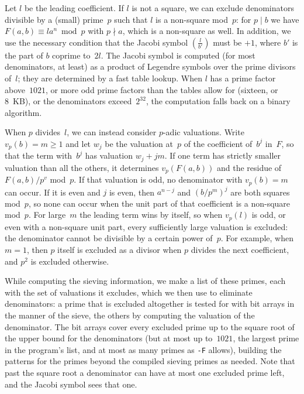 \documentclass[12pt,a4paper,oneside]{amsart}
\begin{document}
Let $l$ be the leading coefficient. If $l$ is not a square, we can exclude
denominators divisible by a (small) prime~$p$ such that $l$ is a non-square
mod~$p$: for $p \mid b$ we have $F(a,b) \equiv l a^n \bmod p$ with $p \nmid
a$, which is a non-square as well. In addition, we use the necessary
condition that the Jacobi symbol $\left(\frac{l}{b'}\right)$ must be $+1$,
where $b'$ is the part of $b$ coprime to~$2l$. The Jacobi symbol
is computed (for most denominators, at least) as a product
of Legendre symbols over the prime divisors of~$l$; they are determined
by a fast table lookup. When $l$ has a prime factor above~$1021$, or more odd
prime factors than the tables allow for (sixteen, or 8~KB), or the
denominators exceed~$2^{32}$, the computation falls back on a binary algorithm.

When $p$ divides~$l$, we can instead consider $p$-adic valuations.
Write $v_p(b) = m \ge 1$ and let $w_j$ be
the valuation at~$p$ of the coefficient of~$b^j$ in~$F$, so that the term
with~$b^j$ has valuation $w_j + jm$. If one term has strictly smaller
valuation than all the others, it determines $v_p(F(a,b))$ and the residue
of $F(a,b)/p^{v}$ mod~$p$. If that valuation is odd, no denominator with
$v_p(b) = m$ can occur. If it is even and $j$ is even, then $a^{n-j}$ and
$(b/p^m)^j$ are both squares mod~$p$, so none can occur when the unit part
of that coefficient is a non-square mod~$p$.
For large~$m$ the leading term wins by itself, so when $v_p(l)$ is
odd, or even with a non-square unit part, every sufficiently large valuation
is excluded: the denominator cannot be divisible by a certain power of~$p$.
For example, when $m = 1$, then $p$ itself is excluded as a divisor
when $p$ divides the next coefficient, and $p^2$ is excluded otherwise.

While computing the sieving information, we make a list of these primes,
each with the set of valuations it excludes, which we then use to eliminate
denominators: a prime that is excluded altogether is tested for with bit
arrays in the manner of the sieve, the others by computing the valuation of
the denominator. The bit arrays cover every excluded prime up to the square
root of the upper bound for the denominators (but at most up to~$1021$, the
largest prime in the program's list, and at most as many primes as
\verb+-F+ allows), building the patterns for the
primes beyond the compiled sieving primes as needed.
Note that past the square root a denominator can have at most one excluded
prime left, and the Jacobi symbol sees that one.
\end{document}
